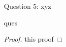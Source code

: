 \begin{solution}{Question 5: xyz}\label{ques:5}
    \begin{question}
    ques
    \end{question}
    \tcblower{}
    \begin{proof}
    this proof
    \end{proof}
\end{solution}
